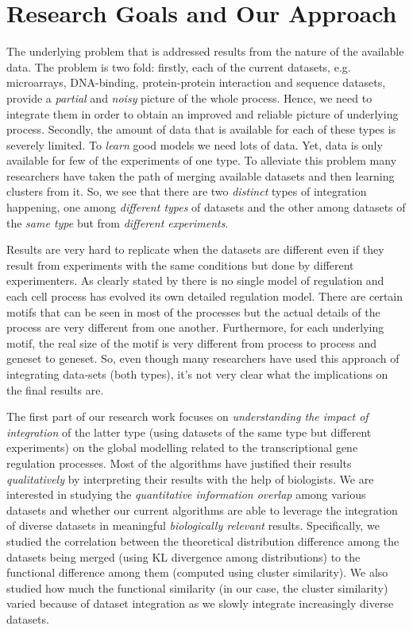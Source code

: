 \section{Research Goals and Our Approach}
The underlying problem that is addressed results from the nature of the available data. The problem is two fold: firstly, each of the current datasets, e.g. microarrays, DNA-binding, protein-protein interaction and sequence datasets, provide a \textit{partial} and \textit{noisy} picture of the whole process. Hence, we need to integrate them in order to obtain an improved and reliable picture of underlying process. Secondly, the amount of data that is available for each of these types is severely limited. To \textit{learn} good models we need lots of data. Yet, data is only available for few of the experiments of one type. To alleviate this problem many researchers have taken the path of merging available datasets and then learning clusters from it. So, we see that there are two \textit{distinct} types of integration happening, one among \textit{different types} of datasets and the other among datasets of the \textit{same type} but from \textit{different experiments}.

Results are very hard to replicate when the datasets are different even if they result from experiments with the same conditions but done by different experimenters. As clearly stated by \citet{orph02thehuman} there is no single model of regulation and each cell process has evolved its own detailed regulation model. There are certain motifs that can be seen in most of the processes but the actual details of the process are very different from one another. Furthermore, for each underlying motif, the real size of the motif is very different from process to process and geneset to geneset. So, even though many researchers have used this approach of integrating data-sets (both types), it's not very clear what the implications on the final results are.

The first part of our research work focuses on \textit{understanding the impact of integration} of the latter type (using datasets of the same type but different experiments) on the global modelling related to the transcriptional gene regulation processes. Most of the algorithms have justified their results \textit{qualitatively} by interpreting their results with the help of biologists. We are interested in studying the \textit{quantitative information overlap} among various datasets and whether our current algorithms are able to leverage the integration of diverse datasets in meaningful \textit{biologically relevant} results. Specifically, we studied the correlation between the theoretical distribution difference among the datasets being merged (using \ac{KL} divergence among distributions) to the functional difference among them (computed using cluster similarity). We also studied how much the functional similarity (in our case, the cluster similarity) varied because of dataset integration as we slowly integrate increasingly diverse datasets. 

